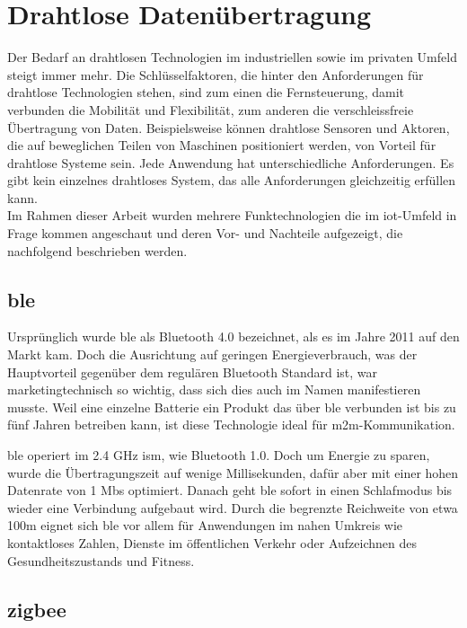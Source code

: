 \chapter{Drahtlose Datenübertragung}

Der Bedarf an drahtlosen Technologien im industriellen sowie im privaten Umfeld steigt immer mehr. Die Schlüsselfaktoren, die hinter den Anforderungen für drahtlose Technologien stehen, sind zum einen die Fernsteuerung, damit verbunden die Mobilität und Flexibilität, zum anderen die verschleissfreie Übertragung von Daten. Beispielsweise können drahtlose Sensoren und Aktoren, die auf beweglichen Teilen von Maschinen positioniert werden, von Vorteil für drahtlose Systeme sein. Jede Anwendung hat unterschiedliche Anforderungen. Es gibt kein einzelnes drahtloses System, das alle Anforderungen gleichzeitig erfüllen kann.\\
Im Rahmen dieser Arbeit wurden mehrere Funktechnologien die im \acrshort{iot}-Umfeld in Frage kommen angeschaut und deren Vor- und Nachteile aufgezeigt, die nachfolgend beschrieben werden.

\section{\acrshort{ble}}

Ursprünglich wurde \acrfull{ble} als \glqq{}Bluetooth 4.0\grqq{} bezeichnet, als es im Jahre 2011 auf den Markt kam. Doch die Ausrichtung auf geringen Energieverbrauch, was der Hauptvorteil gegenüber dem regulären Bluetooth Standard ist, war marketingtechnisch so wichtig, dass sich dies auch im Namen manifestieren musste. Weil eine einzelne Batterie ein Produkt das über \acrshort{ble} verbunden ist bis zu fünf Jahren betreiben kann, ist diese Technologie ideal für \acrshort{m2m}-Kommunikation.

\acrshort{ble} operiert im 2.4 GHz \gls{ism}, wie Bluetooth 1.0. Doch um Energie zu sparen, wurde die Übertragungszeit auf wenige Millisekunden, dafür aber mit einer hohen Datenrate von 1 Mbs optimiert. Danach geht \acrshort{ble} sofort in einen Schlafmodus bis wieder eine Verbindung aufgebaut wird.
Durch die begrenzte Reichweite von etwa 100m eignet sich \acrshort{ble} vor allem für Anwendungen im nahen Umkreis wie kontaktloses Zahlen, Dienste im öffentlichen Verkehr oder Aufzeichnen des Gesundheitszustands und Fitness.

\section{\gls{zigbee}}

